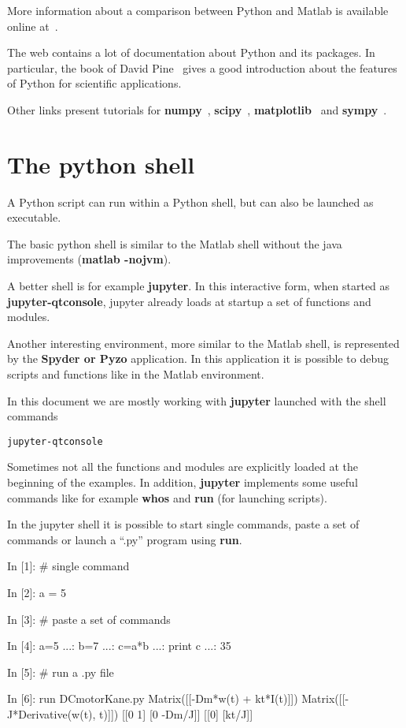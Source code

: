More information about a comparison between Python and Matlab is available 
online at~\cite{PYTHONVSMATLAB}.

The web contains a lot of documentation about Python and its packages.
In particular, the book of David Pine~\cite{PYMAN} gives a good introduction 
about the features of Python for scientific applications.

Other links present tutorials for \textbf{numpy}~\cite{NUMPY},
\textbf{scipy}~\cite{SCIPY}, \textbf{matplotlib}~\cite{MATPLOTLIB} and 
\textbf{sympy}~\cite{SYMPY}.

\section{The python shell}
A Python script can run within a Python shell, but can also be launched as
executable.

The basic python shell is similar to the Matlab shell without the java 
improvements (\textbf{matlab -nojvm}).

A better shell is for example \textbf{jupyter}. In this interactive form, when 
started as \textbf{jupyter-qtconsole}, jupyter already loads at startup 
a set of functions and modules. 

Another interesting environment, more similar to the Matlab shell, is 
represented by the \textbf{Spyder or Pyzo} application. In this application it is
possible to debug scripts and functions like in the Matlab environment.

In this document we are mostly working with \textbf{jupyter} launched with the 
shell commands

\begin{verbatim}
jupyter-qtconsole
\end{verbatim}

Sometimes not all the functions and modules are explicitly loaded at the 
beginning of the examples. In addition, \textbf{jupyter} implements some useful 
commands like for example \textbf{whos} and \textbf{run} (for launching 
scripts).

In the jupyter shell it is possible to start single commands, paste a set of 
commands or launch a ``.py'' program using \textbf{run}.

\begin{code}
In [1]: # single command

In [2]: a = 5

In [3]: # paste a set of commands

In [4]: a=5
   ...: b=7
   ...: c=a*b
   ...: print c
   ...: 
35

In [5]: # run a .py file

In [6]: run DCmotorKane.py
Matrix([[-Dm*w(t) + kt*I(t)]])
Matrix([[-J*Derivative(w(t), t)]])
[[0 1]
 [0 -Dm/J]]
[[0]
 [kt/J]]
\end{code}

